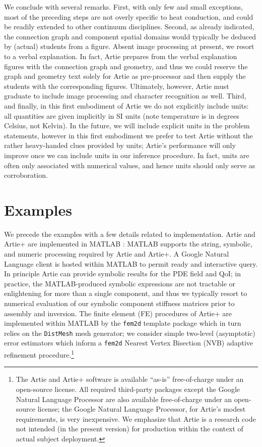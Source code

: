 \documentclass[preprint,12pt]{article}
\begin{document}
We conclude with several remarks. First, with only few and small exceptions, most of the preceding steps are not overly specific to heat conduction, and could be readily extended to other continuum disciplines. Second, as already indicated, the connection graph and component spatial domains would typically be deduced by (actual) students from a figure. Absent image processing at present, we resort to a verbal explanation. In fact, Artie prepares from the verbal explanation figures with the connection graph and geometry, and thus we could reserve the graph and geometry text solely for Artie as pre-processor and then supply the students with the corresponding figures. Ultimately, however, Artie must graduate to include image processing and character recognition as well. Third, and finally, in this first embodiment of Artie we do not explicitly include units: all quantities are given implicitly in SI units (note temperature is in degrees Celsius, not Kelvin). In the future, we will include explicit units in the problem statements, however in this first embodiment we prefer to test Artie without the rather heavy-handed clues provided by units; Artie's performance will only improve once we can include units in our inference procedure. In fact, units are often only associated with numerical values, and hence units should only serve as corroboration.  


\section{Examples}
\label{sec:Ex}

We precede the examples with a few details related to implementation. Artie and Artie+ are implemented in MATLAB \cite{matlab}: MATLAB supports the string, symbolic, and numeric processing required by Artie and Artie+. A Google Natural Language client is hosted within MATLAB \cite{urlread2,PhGNL} to permit ready and interactive query. In principle Artie can provide symbolic results for the PDE field and QoI; in practice, the MATLAB-produced symbolic expressions are not tractable or enlightening for more than a single component, and thus we typically resort to numerical evaluation of our symbolic component stiffness matrices prior to assembly and inversion. The finite element (FE) procedures of Artie+ are implemented within MATLAB by the \texttt{fem2d} template package \cite{Masafem2d} which in turn relies on the \texttt{DistMesh} \cite{Per} mesh generator; we consider  simple two-level (asymptotic)  error estimators \cite{Bab} which inform a \texttt{fem2d} Nearest Vertex Bisection (NVB) adaptive refinement procedure.\footnote{The Artie and Artie+ software is available ``as-is'' free-of-charge under an open-source license. All required third-party packages except the Google Natural Language Processor are also available free-of-charge under an open-source license; the Google Natural Language Processor, for Artie's modest requirements, is very inexpensive. We emphasize that Artie is a research code not intended (in the present version)  for production within the context of actual subject deployment.}
\end{document}

